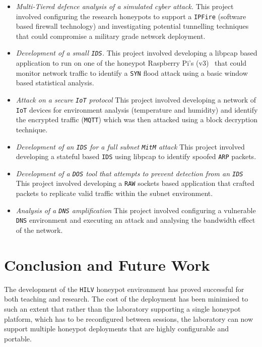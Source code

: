 \documentclass{llncs}
\begin{document}
\begin{itemize} 
  \item \noindent \emph{Multi-Tiered defence analysis of a simulated cyber
    attack.} This project involved configuring the research honeypots to
    support a \texttt{IPFire} (software based firewall technology) and
    investigating potential tunnelling techniques that could compromise a
    military grade network deployment.  
  \item \noindent \emph{Development of a small \texttt{IDS}.} This project
    involved developing a libpcap based application to run on one of the
    honeypot Raspberry Pi's (v3)~\cite{RASP:17} that could monitor network
    traffic to identify a \texttt{SYN} flood attack using a basic window based
    statistical analysis.  
    \item \noindent \emph{Attack on a secure \texttt{IoT} protocol} This
      project involved developing a network of \texttt{IoT} devices for
      environment analysis (temperature and humidity) and identify the
      encrypted traffic (\texttt{MQTT}) which was then attacked using a block
      decryption technique.  
    \item \noindent \emph{Development of an \texttt{IDS} for a full subnet
      \texttt{MitM} attack} This project involved developing a stateful based
      \texttt{IDS} using libpcap to identify spoofed \texttt{ARP} packets.  
    \item \noindent \emph{Development of a \texttt{DOS} tool that attempts to
      prevent detection from an \texttt{IDS}} This project involved developing
      a \texttt{RAW} sockets based application that crafted packets to
      replicate valid traffic within the subnet environment.  
     \item \noindent \emph{Analysis of a \texttt{DNS} amplification} This
       project involved configuring a vulnerable \texttt{DNS} environment and
       executing an attack and analysing the bandwidth effect of the network.
\end{itemize}

\section{Conclusion and Future Work\label{Future}}

The development of the \texttt{HILV} honeypot environment has proved successful
for both teaching and research. The cost of the deployment has been minimised
to such an extent that rather than the laboratory supporting a single honeypot
platform, which has to be reconfigured between sessions, the laboratory can now
support multiple honeypot deployments that are highly configurable and
portable.
\end{document}
